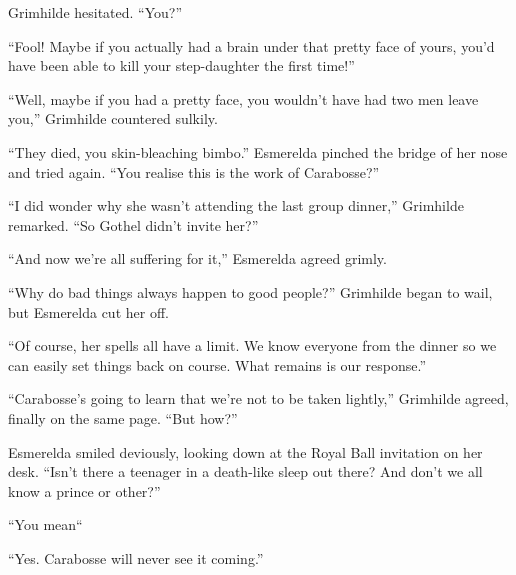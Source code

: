 Grimhilde hesitated. “You?”

“Fool! Maybe if you actually had a brain under that pretty face of yours, you’d have been able to kill your step-daughter the first time!”

“Well, maybe if you had a pretty face, you wouldn’t have had two men leave you,” Grimhilde countered sulkily.

“They died, you skin-bleaching bimbo.” Esmerelda pinched the bridge of her nose and tried again. “You realise this is the work of Carabosse?”

“I did wonder why she wasn’t attending the last group dinner,” Grimhilde remarked. “So Gothel didn’t invite her?”

“And now we’re all suffering for it,” Esmerelda agreed grimly.

“Why do bad things always happen to good people?” Grimhilde began to wail, but Esmerelda cut her off.

“Of course, her spells all have a limit. We know everyone from the dinner so we can easily set things back on course. What remains is our response.”

“Carabosse’s going to learn that we’re not to be taken lightly,” Grimhilde agreed, finally on the same page. “But how?”

Esmerelda smiled deviously, looking down at the Royal Ball invitation on her desk. “Isn’t there a teenager in a death-like sleep out there? And don’t we all know a prince or other?”

“You mean\textendash“

“Yes. Carabosse will never see it coming.”
